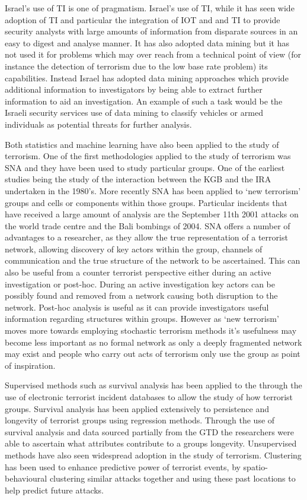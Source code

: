 Israel’s use of TI is one of pragmatism. Israel’s use of TI, while it has seen wide adoption of TI and particular the integration of IOT and and TI to provide security analysts with large amounts of information from disparate sources in an easy to digest and analyse manner. It has also adopted data mining but it has not used it for problems which may over reach from a technical point of view (for instance the detection of terrorism due to the low base rate problem) its capabilities. Instead Israel has adopted data mining approaches which provide additional information to investigators by being able to extract further information to aid an investigation. An example of such a task would be the Israeli security services use of data mining to classify vehicles or armed individuals as potential threats for further analysis.

Both statistics and machine learning have also been applied to the study of terrorism. One of the first methodologies applied to the study of terrorism was SNA and they have been used to study particular groups. One of the earliest studies being the study of the interaction between the KGB and the IRA undertaken in the 1980’s. More recently SNA has been applied to ‘new terrorism’ groups and cells or components within those groups. Particular incidents that have received a large amount of analysis are the September 11th 2001 attacks on the world trade centre and the Bali bombings of 2004. SNA offers a number of advantages to a researcher, as they allow the true representation of a terrorist network, allowing discovery of key actors within the group, channels of communication and the true structure of the network to be ascertained. This can also be useful from a counter terrorist perspective either during an active investigation or post-hoc. During an active investigation key actors can be possibly found and removed from a network causing both disruption to the network. Post-hoc analysis is useful as it can provide investigators useful information regarding structures within groups. However as ‘new terrorism’ moves more towards employing stochastic terrorism methods it’s usefulness may become less important as no formal network as only a deeply fragmented network may exist and people who carry out acts of terrorism only use the group as point of inspiration.

Supervised methods such as survival analysis has been applied to the through the use of electronic terrorist incident databases to allow the study of how terrorist groups. Survival analysis has been applied extensively to persistence and longevity of terrorist groups using regression methods. Through the use of survival analysis and data sourced partially from the GTD the researchers were able to ascertain what attributes contribute to a groups longevity. Unsupervised methods have also seen widespread adoption in the study of terrorism. Clustering has been used to enhance predictive power of terrorist events, by spatio-behavioural clustering  similar attacks together and using these past  locations to help predict future attacks.

